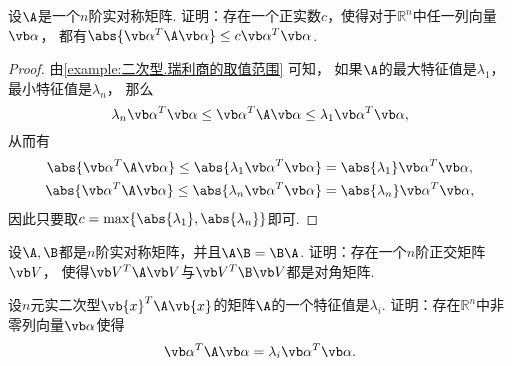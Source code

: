 \begin{example}
设\(\A\)是一个\(n\)阶实对称矩阵.
证明：存在一个正实数\(c\)，使得对于\(\mathbb{R}^n\)中任一列向量\(\vb\alpha\)，
都有\(\abs{\vb\alpha^T \A \vb\alpha} \leq c \vb\alpha^T \vb\alpha\).
\begin{proof}
由\cref{example:二次型.瑞利商的取值范围} 可知，
如果\(\A\)的最大特征值是\(\lambda_1\)，最小特征值是\(\lambda_n\)，
那么\begin{equation*}
	\lambda_n \vb\alpha^T \vb\alpha
	\leq \vb\alpha^T \A \vb\alpha
	\leq \lambda_1 \vb\alpha^T \vb\alpha,
\end{equation*}
从而有\begin{gather*}
	\abs{\vb\alpha^T \A \vb\alpha}
	\leq \abs{\lambda_1 \vb\alpha^T \vb\alpha}
	= \abs{\lambda_1} \vb\alpha^T \vb\alpha, \\
	\abs{\vb\alpha^T \A \vb\alpha}
	\leq \abs{\lambda_n \vb\alpha^T \vb\alpha}
	= \abs{\lambda_n} \vb\alpha^T \vb\alpha,
\end{gather*}
因此只要取\(c = \max\{\abs{\lambda_1},\abs{\lambda_n}\}\)即可.
\end{proof}
\end{example}
\begin{example}
设\(\A,\B\)都是\(n\)阶实对称矩阵，并且\(\A\B=\B\A\).
证明：存在一个\(n\)阶正交矩阵\(\Q\)，
使得\(\Q^T \A \Q\)与\(\Q^T \B \Q\)都是对角矩阵.
\end{example}
\begin{example}
设\(n\)元实二次型\(\vb{x}^T \A \vb{x}\)的矩阵\(\A\)的一个特征值是\(\lambda_i\).
证明：存在\(\mathbb{R}^n\)中非零列向量\(\vb\alpha\)使得\[
	\vb\alpha^T \A \vb\alpha = \lambda_i \vb\alpha^T \vb\alpha.
\]
\end{example}

